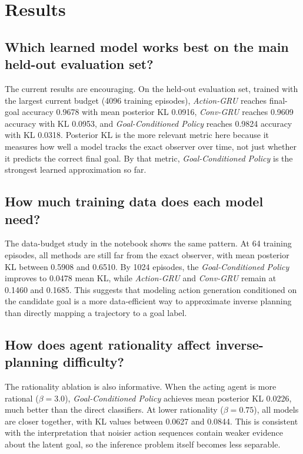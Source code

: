\documentclass[11pt]{article}
\begin{document}
\section{Results}
\subsection{Which learned model works best on the main held-out evaluation set?}
The current results are encouraging. On the held-out evaluation set, trained
with the largest current budget (4096 training episodes), \textit{Action-GRU}
reaches final-goal accuracy 0.9678 with mean posterior KL 0.0916,
\textit{Conv-GRU} reaches 0.9609 accuracy with KL 0.0953, and
\textit{Goal-Conditioned Policy} reaches 0.9824 accuracy with KL 0.0318.
Posterior KL is the more relevant metric here because it measures how well a
model tracks the exact observer over time, not just whether it predicts the
correct final goal. By that metric, \textit{Goal-Conditioned Policy} is the
strongest learned approximation so far.

\subsection{How much training data does each model need?}
The data-budget study in the notebook shows the same pattern. At 64 training
episodes, all methods are still far from the exact observer, with mean
posterior KL between 0.5908 and 0.6510. By 1024 episodes, the
 \textit{Goal-Conditioned Policy} improves to 0.0478 mean KL, while
\textit{Action-GRU} and \textit{Conv-GRU} remain at 0.1460 and 0.1685. This
suggests that modeling action generation conditioned on the candidate goal is a
more data-efficient way to approximate inverse planning than directly mapping a
trajectory to a goal label.

\subsection{How does agent rationality affect inverse-planning difficulty?}
The rationality ablation is also informative. When the acting agent is more
rational ($\beta = 3.0$), \textit{Goal-Conditioned Policy} achieves mean
posterior KL 0.0226, much better than the direct classifiers. At lower
rationality ($\beta = 0.75$), all models are closer together, with KL values
between 0.0627 and 0.0844. This is consistent with the interpretation that
noisier action sequences contain weaker evidence about the latent goal, so the
inference problem itself becomes less separable.
\end{document}

